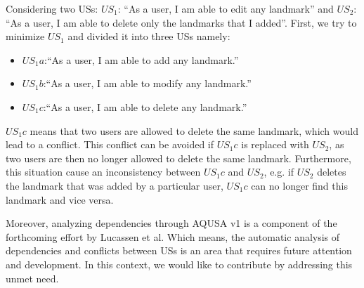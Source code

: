\begin{example}\label{example_conflict}
Considering two USs:  $US_1$: \enquote{As a user, I am able to edit any landmark} and $US_2$: \enquote{As a user, I am able to delete only the landmarks that I added}. First, we try to minimize $US_1$ and divided it into three USs namely:
\begin{itemize}
\item $US_1a$:\enquote{As a user, I am able to add any landmark.}
\item $US_1b$:\enquote{As a user, I am able to modify any landmark.}
\item $US_1c$:\enquote{As a user, I am able to delete any landmark.}
\end{itemize}
$US_1c$ means that two users are allowed to delete the same landmark, which would lead to a conflict. %
This conflict can be avoided if $US_1c$ is replaced with $US_2$, as two users are then no longer allowed to delete the same landmark.
Furthermore, this situation cause an inconsistency between $US_1c$ and $US_2$, e.g. if $US_2$ deletes the landmark that was added by a particular user, $US_1c$ can no longer find this landmark and vice versa.
\end{example}


Moreover, analyzing dependencies through AQUSA v1 is a component of the forthcoming effort by Lucassen et al. Which means, the automatic analysis of dependencies and conflicts between USs is an area that requires future attention and development. In this context, we would like to contribute by addressing this unmet need.
%

